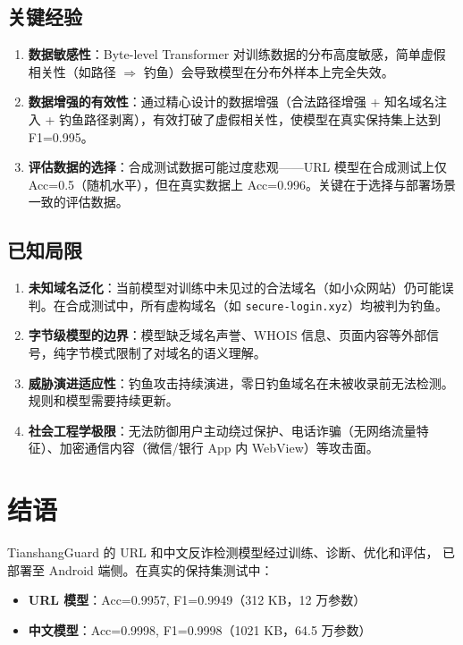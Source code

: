 \documentclass[11pt,a4paper]{article}
\begin{document}
\subsection{关键经验}

\begin{enumerate}
  \item \textbf{数据敏感性}：Byte-level Transformer 对训练数据的分布高度敏感，简单虚假相关性（如路径 $\Rightarrow$ 钓鱼）会导致模型在分布外样本上完全失效。
  \item \textbf{数据增强的有效性}：通过精心设计的数据增强（合法路径增强 + 知名域名注入 + 钓鱼路径剥离），有效打破了虚假相关性，使模型在真实保持集上达到 F1=0.995。
  \item \textbf{评估数据的选择}：合成测试数据可能过度悲观——URL 模型在合成测试上仅 Acc=0.5（随机水平），但在真实数据上 Acc=0.996。关键在于选择与部署场景一致的评估数据。
\end{enumerate}

\subsection{已知局限}

\begin{enumerate}
  \item \textbf{未知域名泛化}：当前模型对训练中未见过的合法域名（如小众网站）仍可能误判。在合成测试中，所有虚构域名（如 \texttt{secure-login.xyz}）均被判为钓鱼。
  \item \textbf{字节级模型的边界}：模型缺乏域名声誉、WHOIS 信息、页面内容等外部信号，纯字节模式限制了对域名的语义理解。
  \item \textbf{威胁演进适应性}：钓鱼攻击持续演进，零日钓鱼域名在未被收录前无法检测。规则和模型需要持续更新。
  \item \textbf{社会工程学极限}：无法防御用户主动绕过保护、电话诈骗（无网络流量特征）、加密通信内容（微信/银行 App 内 WebView）等攻击面。
\end{enumerate}

\section{结语}

TianshangGuard 的 URL 和中文反诈检测模型经过训练、诊断、优化和评估，
已部署至 Android 端侧。在真实的保持集测试中：

\begin{itemize}
  \item \textbf{URL 模型}：Acc=0.9957, F1=0.9949（312 KB，12 万参数）
  \item \textbf{中文模型}：Acc=0.9998, F1=0.9998（1021 KB，64.5 万参数）
\end{itemize}
\end{document}
